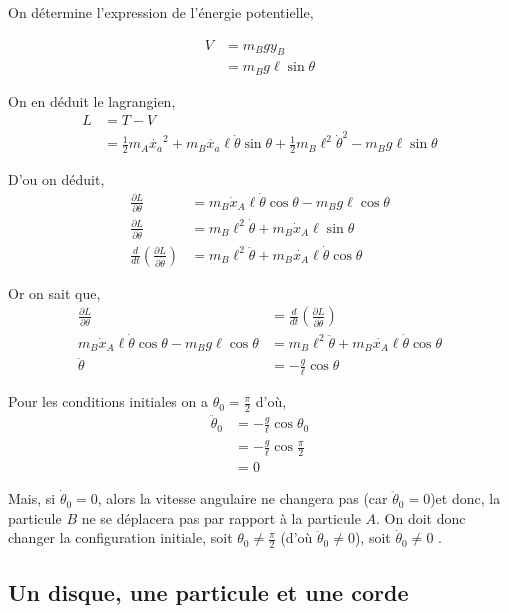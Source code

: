 \documentclass[10pt]{article}
\renewcommand{\delta}{\partial}
\begin{document}
On détermine l'expression de l'énergie potentielle,

\begin{align*}
V &=m_Bgy_B \\
  &=m_Bg\ell\sin{\theta}
\end{align*}

On en déduit le lagrangien,
\begin{align*}
L &= T - V \\
 &= \frac{1}{2}m_A\dot{x_a}^2 + m_B\dot{x_a}\ell\dot{\theta}\sin{\theta}
 + \frac{1}{2}m_B \ell^2\dot{\theta}^2 -  m_Bg\ell\sin{\theta}
\end{align*}

D'ou on déduit,
\begin{align*}
 \frac{\delta L}{\delta\theta} &= m_B\dot{x}_A\ell\dot{\theta}\cos{\theta}-m_Bg\ell\cos{\theta} \\
 \frac{\delta L}{\delta \dot{\theta}} &= m_B\ell^2\dot{\theta} + m_B\dot{x}_A\ell\sin{\theta} \\
 \frac{d}{dt}\left(\frac{\delta L}{\delta \dot{\theta}}\right) &= m_B\ell^2\ddot{\theta}+m_B\dot{x_A}\ell\dot{\theta}\cos{\theta} 
\end{align*}

Or on sait que,
\begin{align*}
  \frac{\delta L}{\delta\theta} &= \frac{d}{dt}\left(\frac{\delta L}{\delta \dot{\theta}}\right) \\
  m_B\dot{x}_A\ell\dot{\theta}\cos{\theta}-m_Bg\ell\cos{\theta} &=  m_B\ell^2\ddot{\theta}+m_B\dot{x_A}\ell\dot{\theta}\cos{\theta}  \\
  \ddot{\theta} &= -\frac{g}{\ell}\cos{\theta}
\end{align*}

Pour les conditions initiales on a $\theta_0 = \frac{\pi}{2}$ d'où,
\begin{align*}
\ddot{\theta}_0 &= -\frac{g}{\ell}\cos{\theta_0}  \\
&= -\frac{g}{\ell}\cos{\frac{\pi}{2}} \\
&= 0
\end{align*}

Mais, si $\dot{\theta}_0 = 0$,  alors la vitesse angulaire ne changera pas (car $\ddot{\theta}_0 = 0$)et donc, la particule $B$ ne se déplacera pas par rapport à la particule $A$. On doit donc changer la configuration initiale, soit $\theta_0 \neq \frac{\pi}{2}$ (d'où $\ddot{\theta}_0 \neq 0$), soit $\dot{\theta}_0 \neq 0$ .

\subsection{Un disque, une particule et une corde}
\end{document}
